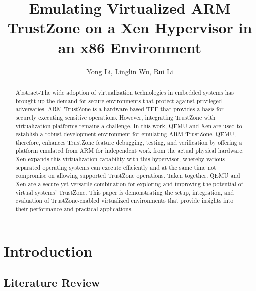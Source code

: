 \documentclass[acmtog]{acmart}
\begin{document}
\title{Emulating Virtualized ARM TrustZone on a Xen Hypervisor in an x86 Environment}


\author{Yong Li, Linglin Wu, Rui Li}

\renewcommand{\shortauthors}{Yong Li, Linglin Wu, Rui Li}


\begin{abstract} 
  Abstract-The wide adoption of virtualization technologies in embedded systems has brought up the demand for secure environments that protect against privileged adversaries. ARM TrustZone is a hardware-based TEE that provides a basis for securely executing sensitive operations. However, integrating TrustZone with virtualization platforms remains a challenge. In this work, QEMU and Xen are used to establish a robust development environment for emulating ARM TrustZone. QEMU, therefore, enhances TrustZone feature debugging, testing, and verification by offering a platform emulated from ARM for independent work from the actual physical hardware. Xen expands this virtualization capability with this hypervisor, whereby various separated operating systems can execute efficiently and at the same time not compromise on allowing supported TrustZone operations. Taken together, QEMU and Xen are a secure yet versatile combination for exploring and improving the potential of virtual systems' TrustZone. This paper is demonstrating the setup, integration, and evaluation of TrustZone-enabled virtualized environments that provide insights into their performance and practical applications. 
\end{abstract}


    
\maketitle

\section{Introduction}



\subsection{Literature Review}
\end{document}
